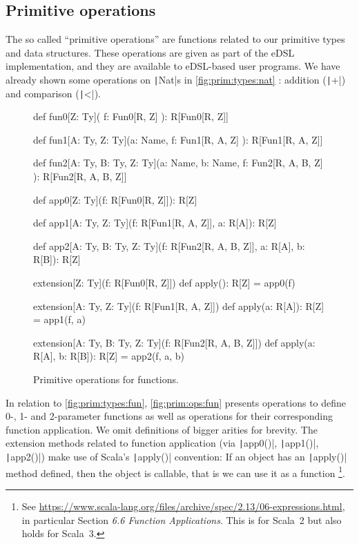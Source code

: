 \documentclass[11pt]{article}
\renewcommand{\vref}[1]{\autoref{#1} \vpageref{#1}}{}
\newcommand{\ScalaI}[1]{\texttt|#1|}
\begin{document}
\subsection{Primitive operations}
\label{sec:prim:ops}
The so called ``primitive operations'' are functions related to our primitive types and data structures. These operations are given as part of the eDSL implementation, and they are available to eDSL-based user programs. We have already shown some operations on \ScalaI{Nat}s in \vref{fig:prim:types:nat}: addition (\ScalaI{+}) and comparison (\ScalaI{<}).

\begin{figure}[tb]
\begin{ScalaBlock}
def fun0[Z: Ty](
  f: Fun0[R, Z]
): R[Fun0[R, Z]]

def fun1[A: Ty, Z: Ty](a: Name,
  f: Fun1[R, A, Z]
): R[Fun1[R, A, Z]]

def fun2[A: Ty, B: Ty, Z: Ty](a: Name, b: Name,
  f: Fun2[R, A, B, Z]
): R[Fun2[R, A, B, Z]]

def app0[Z: Ty](f: R[Fun0[R, Z]]): R[Z]

def app1[A: Ty, Z: Ty](f: R[Fun1[R, A, Z]],
  a: R[A]): R[Z]

def app2[A: Ty, B: Ty, Z: Ty](f: R[Fun2[R, A, B, Z]],
  a: R[A], b: R[B]): R[Z]

extension[Z: Ty](f: R[Fun0[R, Z]])
  def apply(): R[Z] = app0(f)

extension[A: Ty, Z: Ty](f: R[Fun1[R, A, Z]])
  def apply(a: R[A]): R[Z] = app1(f, a)

extension[A: Ty, B: Ty, Z: Ty](f: R[Fun2[R, A, B, Z]])
  def apply(a: R[A], b: R[B]): R[Z] = app2(f, a, b)
\end{ScalaBlock}
\caption{Primitive operations for functions.}
\label{fig:prim:ops:fun}
\hrulefill
\end{figure}

In relation to \autoref{fig:prim:types:fun}, \vref{fig:prim:ops:fun} presents operations to define 0-, 1- and 2-parameter functions as well as operations for their corresponding function application. We omit definitions of bigger arities for brevity. The extension methods related to function application (via \ScalaI{app0()}, \ScalaI{app1()}, \ScalaI{app2()}) make use of Scala's \ScalaI{apply()} convention: If an object has an \ScalaI{apply()} method defined, then the object is callable, that is we can use it as a function%
\footnote{See \href{https://www.scala-lang.org/files/archive/spec/2.13/06-expressions.html}{https://www.scala-lang.org/files/archive/spec/2.13/06-expressions.html}, in particular Section \textit{6.6 Function Applications}. This is for Scala~2 but also holds for Scala~3.}. 
\end{document}
